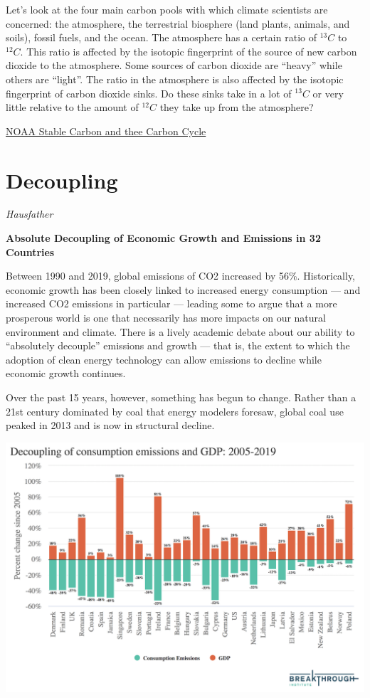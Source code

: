 \documentclass[
]{book}
\begin{document}
Let's look at the four main carbon pools with which climate scientists are concerned: the atmosphere, the terrestrial biosphere (land plants, animals, and soils), fossil fuels, and the ocean. The atmosphere has a certain ratio of \({}^{13}C\) to \({}^{12}C\). This ratio is affected by the isotopic fingerprint of the source of new carbon dioxide to the atmosphere. Some sources of carbon dioxide are ``heavy'' while others are ``light''. The ratio in the atmosphere is also affected by the isotopic fingerprint of carbon dioxide sinks. Do these sinks take in a lot of \({}^{13}C\) or very little relative to the amount of \({}^{12}C\) they take up from the atmosphere?

\href{https://gml.noaa.gov/education/isotopes/stable.html}{NOAA Stable Carbon and thee Carbon Cycle}

\hypertarget{decoupling}{%
\chapter{Decoupling}\label{decoupling}}

\emph{Hausfather}

\textbf{Absolute Decoupling of Economic Growth and Emissions in 32 Countries}

Between 1990 and 2019, global emissions of CO2 increased by 56\%. Historically, economic growth has been closely linked to increased energy consumption --- and increased CO2 emissions in particular --- leading some to argue that a more prosperous world is one that necessarily has more impacts on our natural environment and climate. There is a lively academic debate about our ability to ``absolutely decouple'' emissions and growth --- that is, the extent to which the adoption of clean energy technology can allow emissions to decline while economic growth continues.

Over the past 15 years, however, something has begun to change. Rather than a 21st century dominated by coal that energy modelers foresaw, global coal use peaked in 2013 and is now in structural decline.

\includegraphics{fig/hausfather_decoupling.png}
\end{document}
